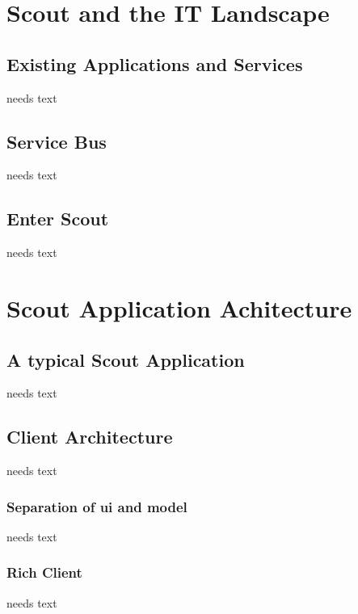 \documentclass[a4paper,10pt,twoside]{book}
\begin{document}
  \sloppy
\fi


\chapter{Scout and the IT Landscape}

\section{Existing Applications and Services}
needs text

\section{Service Bus}
needs text

\section{Enter Scout}
needs text

\chapter{Scout Application Achitecture}

\section{A typical Scout Application}
needs text


  
\section{Client Architecture}
needs text

\subsection{Separation of ui and model}
needs text

\subsection{Rich Client}
needs text
\end{document}
